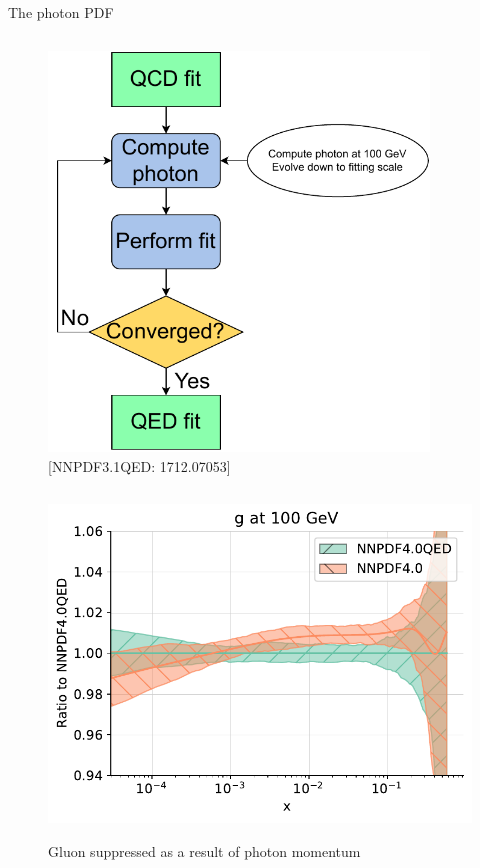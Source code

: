 \documentclass[8pt,t]{beamer}
\begin{document}
\begin{frame}{The photon PDF}
\begin{columns}
    \begin{column}{0.39\textwidth}
      \vspace*{-1.5em}
      \begin{figure}
        \includegraphics[width=0.9\textwidth]{figures/luxqed_iteration.pdf}
        \caption*{\color{gray}\footnotesize [NNPDF3.1QED: 1712.07053]}
      \end{figure}
    \end{column}
  \end{columns}

  \begin{figure}[!t]
    \includegraphics[width=.3\textwidth]{figures/plot_pdfs_g_qed.pdf}\\
    \caption*{Gluon suppressed as a result of photon momentum}
  \end{figure}

\end{frame}


\end{document}
